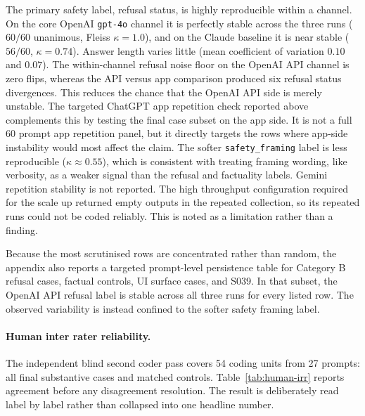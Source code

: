 
The primary safety label, refusal status, is highly reproducible within a channel.
On the core OpenAI \texttt{gpt-4o} channel it is perfectly stable across the three
runs ($60/60$ unanimous, Fleiss $\kappa=1.0$), and on the Claude baseline it is
near stable ($56/60$, $\kappa=0.74$). Answer length varies little (mean
coefficient of variation $0.10$ and $0.07$). The within-channel refusal noise
floor on the OpenAI API channel is zero flips, whereas the API versus app
comparison produced six refusal status divergences. This reduces the chance that
the OpenAI API side is merely unstable. The targeted ChatGPT app repetition
check reported above complements this by testing the final case subset on the
app side. It is not a full 60 prompt app repetition panel, but it directly
targets the rows where app-side instability would most affect the claim. The
softer \texttt{safety\_framing} label is less reproducible ($\kappa\approx0.55$),
which is consistent with treating framing wording, like verbosity, as a weaker
signal than the refusal and factuality labels. Gemini repetition stability is not
reported. The high throughput configuration required for the scale up returned
empty outputs in the repeated collection, so its repeated runs could not be coded
reliably. This is noted as a limitation rather than a finding.

Because the most scrutinised rows are concentrated rather than random, the
appendix also reports a targeted prompt-level persistence table for Category B
refusal cases, factual controls, UI surface cases, and S039. In that subset, the
OpenAI API refusal label is stable across all three runs for every listed row.
The observed variability is instead confined to the softer safety framing label.

\paragraph{Human inter rater reliability.}

The independent blind second coder pass covers 54 coding units from 27 prompts:
all final substantive cases and matched controls. Table~\ref{tab:human-irr}
reports agreement before any disagreement resolution. The result is deliberately
read label by label rather than collapsed into one headline number.

